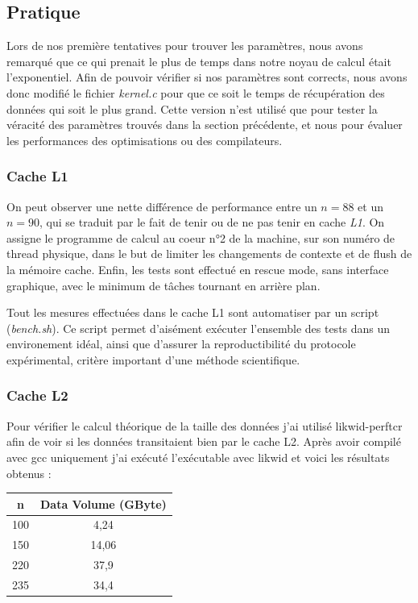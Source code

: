 \documentclass[12pt,a4paper]{article}
\begin{document}
\subsection{Pratique}

Lors de nos première tentatives pour trouver les paramètres, nous avons remarqué
que ce qui prenait le plus de temps dans notre noyau de calcul était
l'exponentiel. Afin de pouvoir vérifier si nos paramètres sont corrects, nous
avons donc modifié le fichier \textit{kernel.c} pour que ce soit le temps de
récupération des données qui soit le plus grand. Cette version n'est utilisé que
pour tester la véracité des paramètres trouvés dans la section précédente, et
nous pour évaluer les performances des optimisations ou des compilateurs.

\subsubsection{Cache L1}

On peut observer une nette différence de performance entre un $n = 88$ et un $n
= 90$, qui se traduit par le fait de tenir ou de ne pas tenir en cache
\textit{L1}. On assigne le programme de calcul au coeur n°2 de la machine, sur
son numéro de thread physique, dans le but de limiter les changements de
contexte et de flush de la mémoire cache. Enfin, les tests sont effectué en
rescue mode, sans interface graphique, avec le minimum de tâches tournant en
arrière plan.

Tout les mesures effectuées dans le cache L1 sont automatiser par un script
(\textit{bench.sh}). Ce script permet d'aisément exécuter l'ensemble des tests
dans un environement idéal, ainsi que d'assurer la reproductibilité du protocole
expérimental, critère important d'une méthode scientifique.

\subsubsection{Cache L2}

Pour vérifier le calcul théorique de la taille des données j'ai utilisé
likwid-perftcr afin de voir si les données transitaient bien par le cache L2.
Après avoir compilé avec gcc uniquement j'ai exécuté l'exécutable avec likwid et
voici les résultats obtenus :
\newline

\begin{tabular}{|c|c|}
  \hline
  n & Data Volume (GByte) \\
  \hline
  100 & 4,24 \\
  \hline
  150 & 14,06 \\
  \hline
  220 & 37,9 \\
  \hline
  235 & 34,4 \\
  \hline
\end{tabular}
\end{document}
